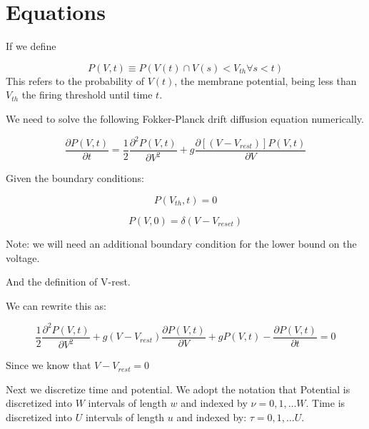 \documentclass[10pt]{article}
\begin{document}
 

\section{Equations}

If we define

\begin{equation}
    P(V,t) \equiv P(V(t) \cap  V(s) < V_{th} \forall s < t)
\end{equation}
This refers to the probability of $V(t)$, the membrane potential,
being less than $V_{th}$ the firing threshold until time $t$.  


We need to solve the following Fokker-Planck drift diffusion equation
numerically.

\begin{equation}
    \frac{\partial P(V,t)}{\partial t} =
    \frac{1}{2} \frac{\partial^2 P(V,t) } {\partial V^2} +
    g\frac{\partial[(V-V_{rest})]P(V,t)}{\partial V}
\end{equation}

Given the boundary conditions:
 
\begin{equation}
    P(V_{th},t) = 0
\end{equation}

\begin{equation}
    P(V,0) = \delta(V-V_{reset})
\end{equation}

Note: we will need an additional boundary condition for the lower
bound on the voltage.

And the definition of V-rest.


We can rewrite this as:

\begin{equation}
    \frac{1}{2} \frac{\partial^2 P(V,t) } {\partial V^2} +
    g(V-V_{rest})\frac{\partial P(V,t)}{\partial V} +
    gP(V,t) -
    \frac{\partial P(V,t)}{\partial t} = 
    0
\end{equation}

Since we know that $ V-V_{rest} = 0 $


Next we discretize time and potential. We adopt the notation that
Potential is discretized into $W$ intervals of length $w$ and indexed
by $\nu= 0,1, \dots W $.  Time is discretized  into $U$ intervals of
length $u$ and indexed by: $\tau= 0,1, \dots U $.

\end{document}

